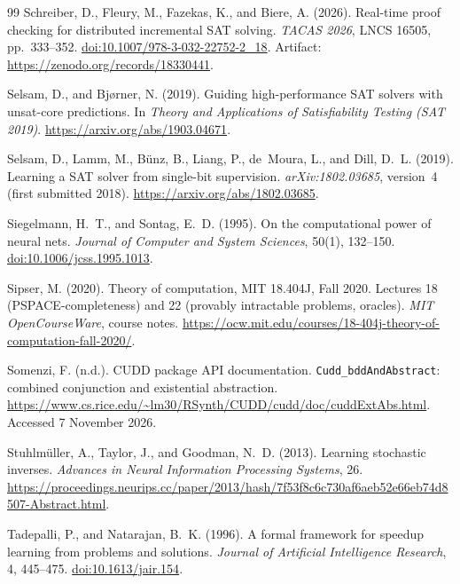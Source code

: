 \documentclass[11pt,a4paper]{article}
\numberwithin{equation}{section}
\theoremstyle{plain}
\theoremstyle{definition}
\theoremstyle{remark}
\begin{document}
\begin{thebibliography}{99}
Schreiber, D., Fleury, M., Fazekas, K., and Biere, A. (2026).
Real-time proof checking for distributed incremental SAT solving.
\emph{TACAS 2026}, LNCS 16505, pp.~333--352.
\href{https://doi.org/10.1007/978-3-032-22752-2_18}{doi:10.1007/978-3-032-22752-2\_18}.
Artifact: \url{https://zenodo.org/records/18330441}.

Selsam, D., and Bj\o rner, N. (2019).
Guiding high-performance SAT solvers with unsat-core predictions.
In \emph{Theory and Applications of Satisfiability Testing (SAT 2019)}.
\url{https://arxiv.org/abs/1903.04671}.

Selsam, D., Lamm, M., B\"unz, B., Liang, P., de~Moura, L., and Dill, D.~L. (2019).
Learning a SAT solver from single-bit supervision.
\emph{arXiv:1802.03685}, version~4 (first submitted 2018).
\url{https://arxiv.org/abs/1802.03685}.

Siegelmann, H.~T., and Sontag, E.~D. (1995).
On the computational power of neural nets.
\emph{Journal of Computer and System Sciences}, 50(1), 132--150.
\href{https://doi.org/10.1006/jcss.1995.1013}{doi:10.1006/jcss.1995.1013}.

Sipser, M. (2020).
Theory of computation, MIT 18.404J, Fall 2020.
Lectures 18 (PSPACE-completeness) and 22 (provably intractable problems, oracles).
\emph{MIT OpenCourseWare}, course notes.
\url{https://ocw.mit.edu/courses/18-404j-theory-of-computation-fall-2020/}.

Somenzi, F. (n.d.). CUDD package API documentation.
\texttt{Cudd\_bddAndAbstract}: combined conjunction and existential abstraction.
\url{https://www.cs.rice.edu/~lm30/RSynth/CUDD/cudd/doc/cuddExtAbs.html}.
Accessed 7 November 2026.

Stuhlm\"uller, A., Taylor, J., and Goodman, N.~D. (2013).
Learning stochastic inverses.
\emph{Advances in Neural Information Processing Systems}, 26.
\url{https://proceedings.neurips.cc/paper/2013/hash/7f53f8c6c730af6aeb52e66eb74d8507-Abstract.html}.

Tadepalli, P., and Natarajan, B.~K. (1996).
A formal framework for speedup learning from problems and solutions.
\emph{Journal of Artificial Intelligence Research}, 4, 445--475.
\href{https://doi.org/10.1613/jair.154}{doi:10.1613/jair.154}.


\end{thebibliography}
\end{document}
